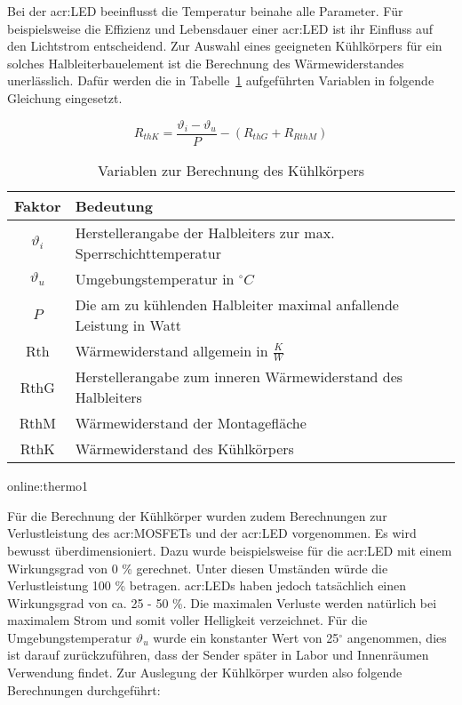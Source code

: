Bei der \gls{acr:LED} beeinflusst die Temperatur beinahe alle Parameter. Für beispielsweise die Effizienz und Lebensdauer einer \gls{acr:LED} ist ihr Einfluss auf den Lichtstrom entscheidend. Zur Auswahl eines geeigneten Kühlkörpers für ein solches Halbleiterbauelement ist die Berechnung des Wärmewiderstandes unerlässlich. Dafür werden die in Tabelle~\ref{tab:thermofaktoren} aufgeführten Variablen in folgende Gleichung eingesetzt.

\begin{equation}
	\label{equ:thermo}
	R_{thK} = \frac{\vartheta_{i}-\vartheta_{u}}{P}-(R_{thG}+R_{RthM})
\end{equation}

\begin{table}[htb]
	\begin{center}
		\begin{tabular}[h]{cl}	
			\toprule
			Faktor & Bedeutung \\
			\midrule
			$\vartheta_{i}$& Herstellerangabe der Halbleiters zur max. Sperrschichttemperatur\\
			$\vartheta_{u}$& Umgebungstemperatur in $^\circ C$ \\
			$P$ &  Die am zu kühlenden Halbleiter maximal anfallende Leistung in Watt\\
			Rth & Wärmewiderstand allgemein in $\frac{K}{W}$ \\
			RthG & Herstellerangabe zum inneren Wärmewiderstand des Halbleiters \\
			RthM & Wärmewiderstand der Montagefläche \\
			RthK &  Wärmewiderstand des Kühlkörpers \\
			\bottomrule
		\end{tabular}
		\caption{Variablen zur Berechnung des Kühlkörpers}\gls{online:thermo1}
		\label{tab:thermofaktoren}
	\end{center}
\end{table}

Für die Berechnung der Kühlkörper wurden zudem Berechnungen zur Verlustleistung des
\gls{acr:MOSFET}s und der \gls{acr:LED} vorgenommen. Es wird bewusst überdimensioniert. Dazu wurde beispielsweise für die \gls{acr:LED} mit einem Wirkungsgrad von 0 \% gerechnet. Unter diesen Umständen würde die Verlustleistung 100 \% betragen. \gls{acr:LED}s haben jedoch tatsächlich einen Wirkungsgrad von ca. 25 - 50 \%. Die maximalen Verluste werden natürlich bei maximalem Strom und somit voller Helligkeit verzeichnet. Für die Umgebungstemperatur $\vartheta_{u}$ wurde ein konstanter Wert von 25$^\circ$ angenommen, dies ist darauf zurückzuführen, dass der Sender später in Labor und Innenräumen Verwendung findet. Zur Auslegung der Kühlkörper wurden also folgende Berechnungen durchgeführt:

